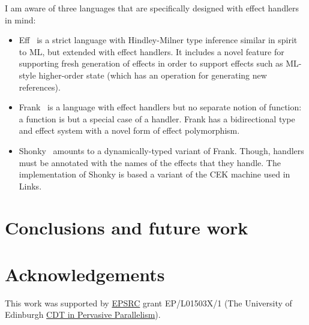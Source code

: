 \documentclass[preprint,9pt,numbers]{sigplanconf}
\begin{document}
I am aware of three languages that are specifically designed with
effect handlers in mind:

\begin{itemize}
\item Eff~\cite{BauerP15} is a strict language with Hindley-Milner
  type inference similar in spirit to ML, but extended with effect
  handlers.
%
  It includes a novel feature for supporting fresh generation of
  effects in order to support effects such as ML-style higher-order
  state (which has an operation for generating new references).

\item Frank~\cite{LindleyMM17} is a language with effect handlers but
  no separate notion of function: a function is but a special case of
  a handler. Frank has a bidirectional type and effect system with a
  novel form of effect polymorphism.
  

\item Shonky~\cite{McBride16} amounts to a dynamically-typed variant
  of Frank. Though, handlers must be annotated with the names of the
  effects that they handle. The implementation of Shonky is based a
  variant of the CEK machine used in Links.
\end{itemize}


\section{Conclusions and future work}
\label{sec:conclusions}

\section{Acknowledgements}
This work was supported by \href{https://www.epsrc.ac.uk/}{EPSRC}
grant EP/L01503X/1 (The University of Edinburgh
\href{http://pervasiveparallelism.inf.ed.ac.uk}{CDT in Pervasive
  Parallelism}).

\nocite{*}

\softraggedright
\end{document}
